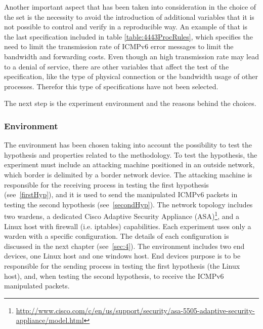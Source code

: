 \documentclass[12pt]{article}
\begin{document}
Another important aspect that has been taken into consideration in the choice of the set is the necessity to avoid the introduction of additional variables that it is not possible to control and verify in a reproducible way. An example of that is the last specification included in table \ref{table:4443ProcRules}, which specifies the need to limit the transmission rate of ICMPv6 error messages to limit the bandwidth and forwarding costs. Even though an high transmission rate may lead to a denial of service, there are other variables that affect the test of the specification, like the type of physical connection or the bandwidth usage of other processes. Therefor this type of specifications have not been selected.

The next step is the experiment environment and the reasons behind the choices.

\subsubsection{Environment}
\label{subsub:enviroment}

The environment has been chosen taking into account the possibility to test the hypothesis and properties related to the methodology. To test the hypothesis, the experiment must include an attacking machine positioned in an outside network, which border is delimited by a border network device. The attacking machine is responsible for the receiving process in testing the first hypothesis (see~\ref{firstHyp}), and it is used to send the manipulated ICMPv6 packets in testing the second hypothesis (see~\ref{secondHyp}). The network topology includes two wardens, a dedicated Cisco Adaptive Security Appliance (ASA)\footnote{\url{http://www.cisco.com/c/en/us/support/security/asa-5505-adaptive-security-appliance/model.html}}, and a Linux host with firewall (i.e. iptables) capabilities. Each experiment uses only a warden with a specific configuration. The details of each configuration is discussed in the next chapter (see~\ref{sec:4}). The environment includes two end devices, one Linux host and one windows host. End devices purpose is to be responsible for the sending process in testing the first hypothesis (the Linux host), and, when testing the second hypothesis, to receive the ICMPv6 manipulated packets.
\end{document}
